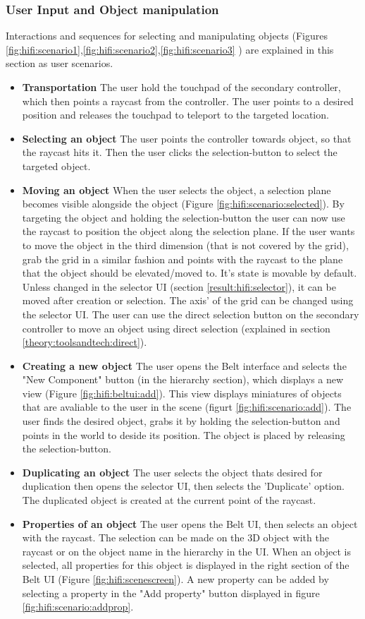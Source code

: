 \subsubsection{User Input and Object manipulation}
Interactions and sequences for selecting and manipulating objects (Figures \ref{fig:hifi:scenario1},\ref{fig:hifi:scenario2},\ref{fig:hifi:scenario3} ) are explained in this section as user scenarios.
\begin{itemize}
  \item \textbf{Transportation} The user hold the touchpad of the secondary controller, which then points a raycast from the controller. The user points to a desired position and releases the touchpad to teleport to the targeted location.
  \item \textbf{Selecting an object} The user points the controller towards object, so that the raycast hits it. Then the user clicks the selection-button to select the targeted object.
  \item \textbf{Moving an object} When the user selects the object,  a selection plane becomes visible alongside the object (Figure \ref{fig:hifi:scenario:selected}). By targeting the object and holding the selection-button the user can now use the raycast to position the object along the selection plane. If the user wants to move the object in the third dimension (that is not covered by the grid), grab the grid in a similar fashion and points with the raycast to the plane that the object should be elevated/moved to. It's state is movable by default. Unless changed in the selector UI (section \ref{result:hifi:selector}), it can be moved after creation or selection. The axis' of the grid can be changed using the selector UI. The user can use the direct selection button on the secondary controller to move an object using direct selection (explained in section \ref{theory:toolsandtech:direct}).
  \item \textbf{Creating a new object} The user opens the Belt interface and selects the "New Component" button (in the hierarchy section), which displays a new view (Figure \ref{fig:hifi:beltui:add}). This view displays miniatures of objects that are avaliable to the user in the scene (figurt \ref{fig:hifi:scenario:add}). The user finds the desired object, grabs it by holding the selection-button and points in the world to deside its position. The object is placed by releasing the selection-button.
  \item \textbf{Duplicating an object} The user selects the object thats desired for duplication then opens the selector UI, then selects the 'Duplicate' option. The duplicated object is created at the current point of the raycast.
  \item \textbf{Properties of an object} The user opens the Belt UI, then selects an object with the raycast. The selection can be made on the 3D object with the raycast or on the object name in the hierarchy in the UI. When an object is selected, all properties for this object is displayed in the right section of the Belt UI (Figure \ref{fig:hifi:scenescreen}). A new property can be added by selecting a property in the "Add property" button displayed in figure \ref{fig:hifi:scenario:addprop}.
\end{itemize}

